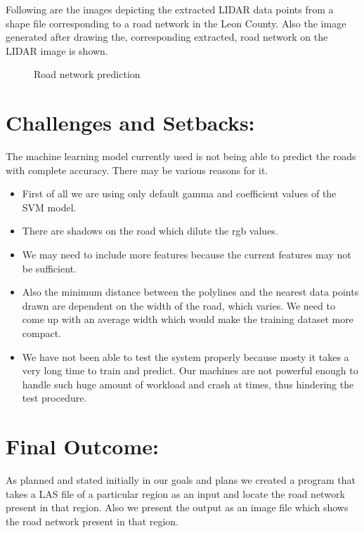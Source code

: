 \documentclass[12pt,letterpaper]{article}
\begin{document}
Following are the images depicting the extracted LIDAR data points from a shape file corresponding to a road network in the Leon County. Also the image generated after drawing the, corresponding extracted, road network on the LIDAR image is shown.

\begin{figure}[!h]
  \centering
  \hfill
  \hfill
  \hfill
  \caption{Road network prediction}
\end{figure}

\section{Challenges and Setbacks:}

The machine learning model currently used is not being able to predict the roads with complete accuracy. There may be various reasons for it. 
\begin{itemize}
\item First of all we are using only default gamma and coefficient values of the SVM model. 
\item There are shadows on the road which dilute the rgb values. 
\item We may need to include more features because the current features may not be sufficient. 
\item Also the minimum distance between the polylines and the nearest data points drawn are dependent on the width of the road, which varies. We need to come up with an average width which would make the training dataset more compact. 
\item We have not been able to test the system properly because mosty it takes a very long time to train and predict. Our machines are not powerful enough to handle such huge amount of workload and crash at times, thus hindering the test procedure.
\end{itemize}

\section{Final Outcome:}
As planned and stated initially in our goals and plans we created a program that takes a LAS file of a particular region as an input and locate the road network present in that region.
Also we present the output as an image file which shows the road network present in that region.
\end{document}
